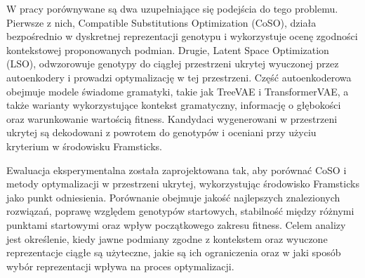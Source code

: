 W pracy porównywane są dwa uzupełniające się podejścia do tego problemu. Pierwsze z nich, Compatible Substitutions Optimization (CoSO), działa bezpośrednio w dyskretnej reprezentacji genotypu i wykorzystuje ocenę zgodności kontekstowej proponowanych podmian. Drugie, Latent Space Optimization (LSO), odwzorowuje genotypy do ciągłej przestrzeni ukrytej wyuczonej przez autoenkodery i prowadzi optymalizację w tej przestrzeni. Część autoenkoderowa obejmuje modele świadome gramatyki, takie jak TreeVAE i TransformerVAE, a także warianty wykorzystujące kontekst gramatyczny, informację o głębokości oraz warunkowanie wartością fitness. Kandydaci wygenerowani w przestrzeni ukrytej są dekodowani z powrotem do genotypów \fone{} i oceniani przy użyciu kryterium \vertpos{} w środowisku Framsticks.

Ewaluacja eksperymentalna została zaprojektowana tak, aby porównać CoSO i metody optymalizacji w przestrzeni ukrytej, wykorzystując środowisko Framsticks jako punkt odniesienia. Porównanie obejmuje jakość najlepszych znalezionych rozwiązań, poprawę względem genotypów startowych, stabilność między różnymi punktami startowymi oraz wpływ początkowego zakresu fitness. Celem analizy jest określenie, kiedy jawne podmiany zgodne z kontekstem oraz wyuczone reprezentacje ciągłe są użyteczne, jakie są ich ograniczenia oraz w jaki sposób wybór reprezentacji wpływa na proces optymalizacji.

\cleardoublepage
